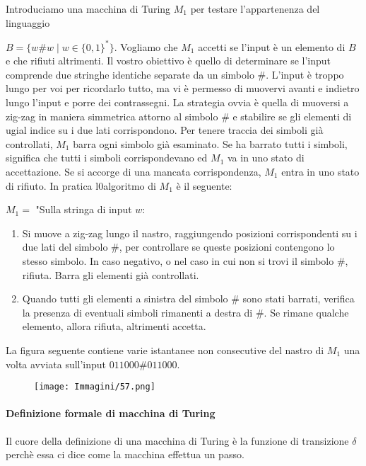 \documentclass{article}
\begin{document}
Introduciamo una macchina di Turing $M_1$ per testare l'appartenenza del linguaggio 

$B = \{w\#w\mid w\in \{0,1\}^* \}$.
Vogliamo che $M_1$ accetti se l'input è un elemento di $B$ e che rifiuti altrimenti.
Il vostro obiettivo è quello di determinare se l'input comprende due stringhe identiche separate da un simbolo $\#$.
L'input è troppo lungo per voi per ricordarlo tutto, ma vi è permesso di muovervi avanti e indietro lungo l'input e porre dei contrassegni.
La strategia ovvia è quella di muoversi a zig-zag in maniera simmetrica attorno al simbolo $\#$ e stabilire se gli elementi di ugial indice su i due lati corrispondono.
Per tenere traccia dei simboli già controllati, $M_1$ barra ogni simbolo già esaminato.
Se ha barrato tutti i simboli, significa che tutti i simboli corrispondevano ed $M_1$ va in uno stato di accettazione.
Se si accorge di una mancata corrispondenza, $M_1$ entra in uno stato di rifiuto.
In pratica l0algoritmo di $M_1$ è il seguente:

$M_1 = $ "Sulla stringa di input $w$:
\begin{enumerate}
    \item Si muove a zig-zag lungo il nastro, raggiungendo posizioni corrispondenti su i due lati del simbolo $\#$, per controllare se queste posizioni contengono lo stesso simbolo. In caso negativo, o nel caso in cui non si trovi il simbolo $\#$, rifiuta. Barra gli elementi già controllati.
    \item Quando tutti gli elementi a sinistra del simbolo $\#$ sono stati barrati, verifica la presenza di eventuali simboli rimanenti a destra di $\#$. Se rimane qualche elemento, allora rifiuta, altrimenti accetta.
\end{enumerate}

La figura seguente contiene varie istantanee non consecutive del nastro di $M_1$ una volta avviata sull'input $011000\#011000$.

\begin{figure}[H]
    \centering
    \texttt{[image: Immagini/57.png]}
    \label{fig:turing_machine_example}
\end{figure}

\paragraph{Definizione formale di macchina di Turing}
\label{def:turing_machine}
\text{ }

Il cuore della definizione di una macchina di Turing è la funzione di transizione $\delta$ perchè essa ci dice come la macchina effettua un passo.
\end{document}
